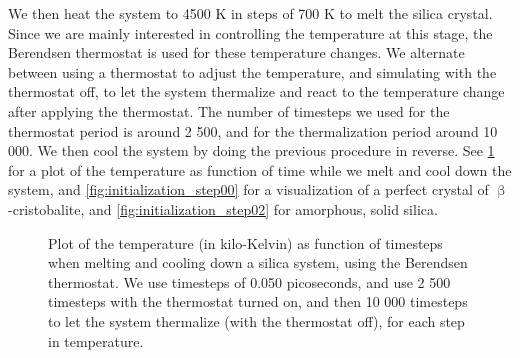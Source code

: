 We then heat the system to 4500 K in steps of 700 K to melt the silica crystal. Since we are mainly interested in controlling the temperature at this stage, the Berendsen thermostat is used for these temperature changes. We alternate between using a thermostat to adjust the temperature, and simulating with the thermostat off, to let the system thermalize and react to the temperature change after applying the thermostat. The number of timesteps we used for the thermostat period is around 2 500, and for the thermalization period around 10 000. We then cool the system by doing the previous procedure in reverse. See \cref{fig:plot_heat_melt_sio2} for a plot of the temperature as function of time while we melt and cool down the system, and \cref{fig:initialization_step00} for a visualization of a perfect crystal of $\upbeta$-cristobalite, and \cref{fig:initialization_step02} for amorphous, solid silica.%
%
\begin{figure}[htpb]%
    \centering%
    \caption{%
        Plot of the temperature (in kilo-Kelvin) as function of timesteps when melting and cooling down a silica system, using the Berendsen thermostat. We use timesteps of 0.050 picoseconds, and use 2 500 timesteps with the thermostat turned on, and then 10 000 timesteps to let the system thermalize (with the thermostat off), for each step in temperature. 
        \label{fig:plot_heat_melt_sio2}%
    }%
\end{figure}%
%

